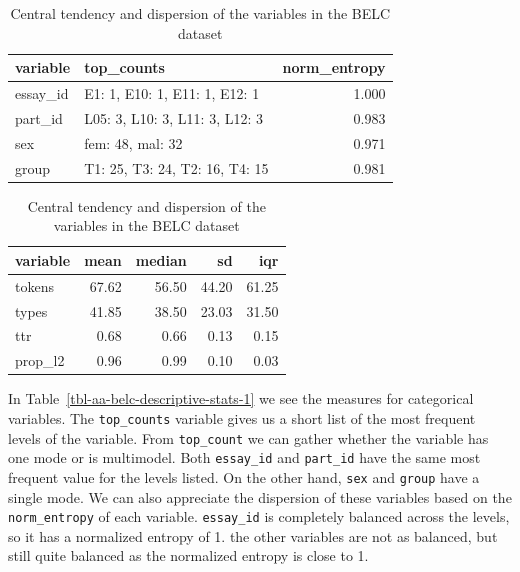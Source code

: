 \documentclass[
  letterpaper,
  DIV=11,
  numbers=noendperiod]{scrreport}
\theoremstyle{definition}
\theoremstyle{remark}
\begin{document}
\begin{table}

\caption{\label{tbl-aa-belc-descriptive-stats}Central tendency and
dispersion of the variables in the BELC
dataset}\begin{minipage}[t]{0.50\linewidth}

{\centering 

\begin{tabular}[t]{llr}
\toprule
variable & top\_counts & norm\_entropy\\
\midrule
essay\_id & E1: 1, E10: 1, E11: 1, E12: 1 & 1.000\\
part\_id & L05: 3, L10: 3, L11: 3, L12: 3 & 0.983\\
sex & fem: 48, mal: 32 & 0.971\\
group & T1: 25, T3: 24, T2: 16, T4: 15 & 0.981\\
\bottomrule
\end{tabular}

}

\end{minipage}%
%
\begin{minipage}[t]{0.50\linewidth}

{\centering 

\begin{tabular}[t]{lrrrr}
\toprule
variable & mean & median & sd & iqr\\
\midrule
tokens & 67.62 & 56.50 & 44.20 & 61.25\\
types & 41.85 & 38.50 & 23.03 & 31.50\\
ttr & 0.68 & 0.66 & 0.13 & 0.15\\
prop\_l2 & 0.96 & 0.99 & 0.10 & 0.03\\
\bottomrule
\end{tabular}

}

\end{minipage}%

\end{table}

In Table~\ref{tbl-aa-belc-descriptive-stats-1} we see the measures for
categorical variables. The \texttt{top\_counts} variable gives us a
short list of the most frequent levels of the variable. From
\texttt{top\_count} we can gather whether the variable has one mode or
is multimodel. Both \texttt{essay\_id} and \texttt{part\_id} have the
same most frequent value for the levels listed. On the other hand,
\texttt{sex} and \texttt{group} have a single mode. We can also
appreciate the dispersion of these variables based on the
\texttt{norm\_entropy} of each variable. \texttt{essay\_id} is
completely balanced across the levels, so it has a normalized entropy of
1. the other variables are not as balanced, but still quite balanced as
the normalized entropy is close to 1.
\end{document}
